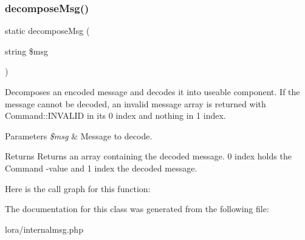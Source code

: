 \mbox{\label{class_internal_m_s_g_ab515acd10479df5ff64b2584a2f8fa9d}} 
\subsubsection{\texorpdfstring{decompose\+Msg()}{decomposeMsg()}}
{\footnotesize\ttfamily static decompose\+Msg (\begin{DoxyParamCaption}\item[{string}]{\$msg }\end{DoxyParamCaption})\hspace{0.3cm}{\ttfamily [static]}}

Decomposes an encoded message and decodes it into useable component. If the message cannot be decoded, an invalid message array is returned with Command\+::\+I\+N\+V\+A\+L\+ID in its 0 index and nothing in 1 index. 
\begin{DoxyParams}{Parameters}
{\em \$msg} & Message to decode. \\
\hline
\end{DoxyParams}
\begin{DoxyReturn}{Returns}
Returns an array containing the decoded message. 0 index holds the Command -\/value and 1 index the decoded message. 
\end{DoxyReturn}

Here is the call graph for this function\+:


The documentation for this class was generated from the following file\+:\begin{DoxyCompactItemize}
\item 
lora/internalmsg.\+php\end{DoxyCompactItemize}
